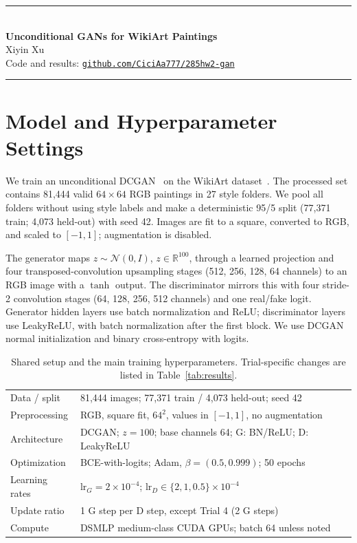 \documentclass{article}
\begin{document}
\begin{center}
\rule{\linewidth}{1.2pt}\\[7pt]
{\LARGE\bfseries Unconditional GANs for WikiArt Paintings}\\[6pt]
{\large Xiyin Xu}\\[3pt]
{\small Code and results: \href{https://github.com/CiciAa777/285hw2-gan}{\texttt{github.com/CiciAa777/285hw2-gan}}}\\[3pt]
\rule{\linewidth}{0.6pt}
\end{center}
\vspace{-5pt}

\section{Model and Hyperparameter Settings}
We train an unconditional DCGAN~\cite{dcgan} on the WikiArt dataset~\cite{wikiart}. The processed set contains 81,444 valid $64\times64$ RGB paintings in 27 style folders. We pool all folders without using style labels and make a deterministic 95/5 split (77,371 train; 4,073 held-out) with seed 42. Images are fit to a square, converted to RGB, and scaled to $[-1,1]$; augmentation is disabled.

The generator maps $z\sim\mathcal N(0,I)$, $z\in\mathbb R^{100}$, through a learned projection and four transposed-convolution upsampling stages (512, 256, 128, 64 channels) to an RGB image with a $\tanh$ output. The discriminator mirrors this with four stride-2 convolution stages (64, 128, 256, 512 channels) and one real/fake logit. Generator hidden layers use batch normalization and ReLU; discriminator layers use LeakyReLU, with batch normalization after the first block. We use DCGAN normal initialization and binary cross-entropy with logits.

\begin{table}[!ht]
\centering
\caption{Shared setup and the main training hyperparameters. Trial-specific changes are listed in Table~\ref{tab:results}.}
\label{tab:setup}
\small
\setlength{\tabcolsep}{4pt}
\begin{tabular}{@{}ll@{}}
\toprule
Data / split & 81,444 images; 77,371 train / 4,073 held-out; seed 42 \\
Preprocessing & RGB, square fit, $64^2$, values in $[-1,1]$, no augmentation \\
Architecture & DCGAN; $z=100$; base channels 64; G: BN/ReLU; D: LeakyReLU \\
Optimization & BCE-with-logits; Adam, $\beta=(0.5,0.999)$; 50 epochs \\
Learning rates & $\mathrm{lr}_G=2\times10^{-4}$; $\mathrm{lr}_D\in\{2,1,0.5\}\times10^{-4}$ \\
Update ratio & 1 G step per D step, except Trial 4 (2 G steps) \\
Compute & DSMLP medium-class CUDA GPUs; batch 64 unless noted \\
\bottomrule
\end{tabular}
\end{table}
\end{document}
